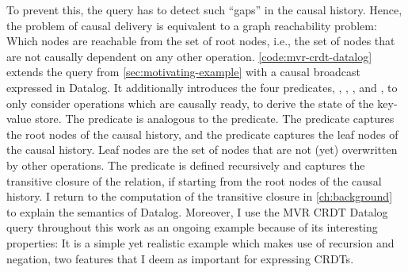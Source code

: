 To prevent this, the query has to detect such ``gaps'' in the causal history.
Hence, the problem of causal delivery is equivalent to a graph reachability
problem: Which nodes are reachable from the set of root nodes, i.e., the set of
nodes that are not causally dependent on any other operation.
\ref{code:mvr-crdt-datalog} extends the query from \autoref{sec:motivating-example}
with a causal broadcast expressed in Datalog.
It additionally introduces the four predicates, , ,
, and , to only consider operations
which are causally ready, to derive the state of the key-value store.
The  predicate is analogous to the  predicate.
The  predicate captures the root nodes of the causal history,
and the  predicate captures the leaf nodes of the causal history.
Leaf nodes are the set of nodes that are not (yet) overwritten by other operations.
The  predicate is defined recursively and captures
the transitive closure of the  relation,
if starting from the root nodes of the causal history.
I return to the computation of the transitive closure in \ref{ch:background} to
explain the semantics of Datalog.
Moreover, I use the \ac{MVR} \ac{CRDT} Datalog query throughout this work
as an ongoing example because of its interesting properties:
It is a simple yet realistic example which makes use of recursion and negation,
two features that I deem as important for expressing \acp{CRDT}.

